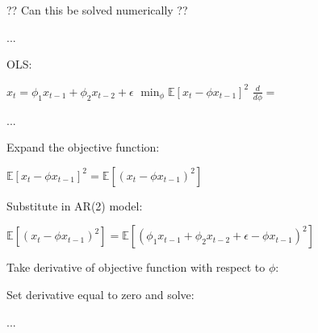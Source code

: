 \documentclass[latex/main.tex]{subfiles}
\begin{document}
?? Can this be solved numerically ??

...

OLS:

$x_t = \phi_1 x_{t-1} + \phi_2 x_{t-2} + \epsilon$  
$\min_{\phi} \mathbb{E} \left[ x_t - \phi x_{t-1} \right]^2$  
$\frac{d}{d\phi} = $

...

Expand the objective function:

$\mathbb{E} \left[ x_t - \phi x_{t-1} \right]^2 = \mathbb{E} \left[ (x_t - \phi x_{t-1})^2 \right]$

Substitute in AR(2) model:

$\mathbb{E} \left[ (x_t - \phi x_{t-1})^2 \right] = \mathbb{E} \left[ (\phi_1 x_{t-1} + \phi_2 x_{t-2} + \epsilon - \phi x_{t-1})^2 \right]$

Take derivative of objective function with respect to $\phi$:

Set derivative equal to zero and solve:

...
\end{document}

